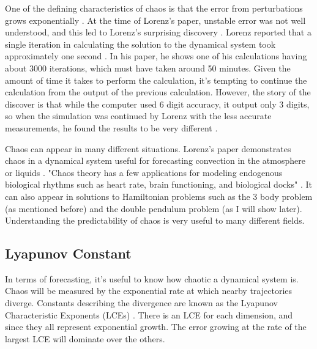 \documentclass{article}
\begin{document}
One of the defining characteristics of chaos is that the error from 
perturbations grows exponentially \cite{oestreicher2007history}. At the time of 
Lorenz's paper, unstable 
error was not well understood, and this led to Lorenz's surprising discovery 
\cite{oestreicher2007history}. Lorenz reported that a single iteration in 
calculating the solution to the dynamical system took 
approximately one second \cite{lorenz1963deterministic}. In his paper, he shows 
one of his calculations having about 3000 iterations, which must have taken 
around 50 minutes. Given the amount of time it takes to perform the calculation,
it's tempting to continue the calculation from the output of the previous 
calculation. However, the story of the discover is that while the computer used 
6 digit accuracy, it output only 3 digits, so when the simulation was continued 
by Lorenz with the less accurate measurements, he found the results to be very 
different \cite{oestreicher2007history}. 

Chaos can appear in many different situations. Lorenz's paper demonstrates chaos
in a dynamical system useful for forecasting convection in the atmosphere or 
liquids \cite{lorenz1963deterministic}. "Chaos theory has a few applications for
modeling endogenous biological rhythms such as heart rate, brain functioning, 
and biological docks" \cite{oestreicher2007history}. It can also appear in 
solutions to Hamiltonian problems such as the 3 body problem (as mentioned 
before) and the double pendulum problem (as I will show later). Understanding
the predictability of chaos is very useful to many different fields.

\subsection{Lyapunov Constant}

In terms of forecasting, it's useful to know how chaotic a dynamical system is. 
Chaos will be measured by the exponential rate at which nearby trajectories 
diverge. Constants describing the divergence are known as the Lyapunov 
Characteristic Exponents (LCEs) \cite{sandri1996numerical}. There is an LCE for 
each dimension, and since they all represent exponential growth. The error 
growing at the rate of the largest LCE will dominate over the others.

\end{document}
